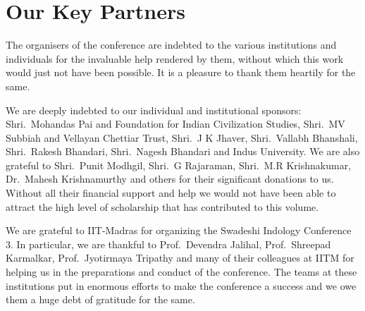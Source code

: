 
\chapter*{Our Key Partners}\label{keypartners}

The organisers of the conference are indebted to the various institutions and individuals for the invaluable help rendered by them, without which this work would just not have been possible. It is a pleasure to thank them heartily for the same.

We are deeply indebted to our individual and institutional sponsors: Shri.\ Mohandas Pai and Foundation for Indian Civilization Studies, Shri.\ MV Subbiah and Vellayan Chettiar Trust, Shri.\ J K Jhaver, Shri.\ Vallabh Bhanshali, Shri.\ Rakesh Bhandari, Shri.\ Nagesh Bhandari and Indus University. We are also grateful to Shri.\ Punit Modhgil, Shri.\ G Rajaraman, Shri.\ M.R Krishnakumar, Dr.\ Mahesh Krishnamurthy and others for their significant donations to us. Without all their financial support and help we would not have been able to attract the high level of scholarship that has contributed to this volume.

We are grateful to IIT-Madras for organizing the Swadeshi Indology Conference 3. In particular, we are thankful to Prof.\ Devendra Jalihal, Prof.\ Shreepad Karmalkar, Prof.\ Jyotirmaya Tripathy and many of their colleagues at IITM for helping us in the preparations and conduct of the conference. The teams at these institutions put in enormous efforts to make the conference a success and we owe them a huge debt of gratitude for the same.

